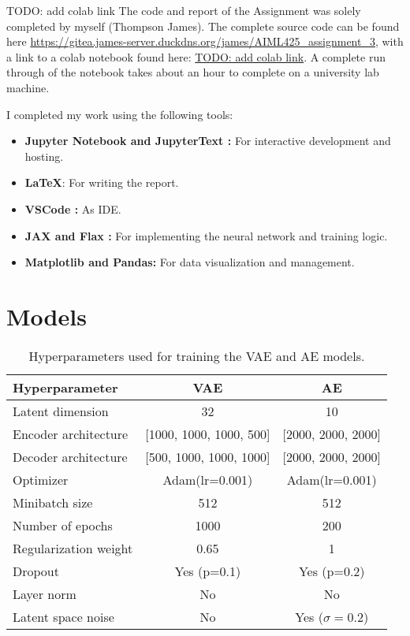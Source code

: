 \documentclass[conference,a4paper]{IEEEtran}
\begin{document}
TODO: add colab link
The code and report of the Assignment was solely completed by myself (Thompson James). The complete source code can be found here \url{https://gitea.james-server.duckdns.org/james/AIML425\_assignment\_3}, with a link to a colab notebook found here: \url{TODO: add colab link}. A complete run through of the notebook takes about an hour to complete on a university lab machine.

I completed my work using the following tools:
\begin{itemize}
    \item \textbf{Jupyter Notebook \cite{Kluyver2016jupyter} and JupyterText \cite{woutsMwoutsJupytext2025}:} For interactive development and hosting.
    \item \textbf{\LaTeX}: For writing the report.
    \item \textbf{VSCode \cite{MicrosoftVscode2025}:} As IDE.
    \item \textbf{JAX \cite{jax2018github} and Flax \cite{flax2020github}:} For implementing the neural network and training logic.
    \item \textbf{Matplotlib\cite{Hunter:2007} and Pandas\cite{thepandasdevelopmentteamPandasdevPandasPandas}:} For data visualization and management.
\end{itemize}





\appendix

\section{Models}

\begin{table}[htbp]
\caption{Hyperparameters used for training the VAE and AE models.}
\label{tab:hyperparams}
\centering
\begin{tabular}{l|c|c}
\toprule
\textbf{Hyperparameter} & \textbf{VAE} & \textbf{AE} \\
\midrule
Latent dimension & 32 & 10 \\
Encoder architecture & [1000, 1000, 1000, 500] & [2000, 2000, 2000] \\
Decoder architecture & [500, 1000, 1000, 1000] & [2000, 2000, 2000] \\
Optimizer & Adam(lr=0.001) & Adam(lr=0.001) \\
Minibatch size & 512 & 512 \\
Number of epochs & 1000 & 200 \\
Regularization weight & 0.65 & 1 \\
Dropout & Yes (p=0.1) & Yes (p=0.2) \\
Layer norm & No & No \\
Latent space noise & No & Yes ($\sigma=0.2$) \\
\bottomrule
\end{tabular}
\end{table}
\end{document}
